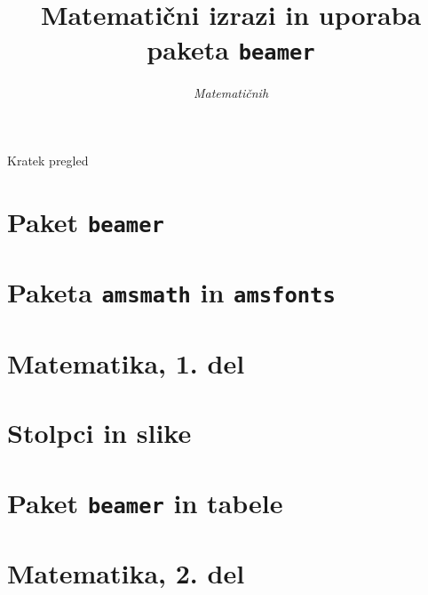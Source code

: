 \documentclass{beamer}
\begin{document}
\title{Matematični izrazi in uporaba paketa \texttt{beamer}}
\subtitle{\emph{Matematičnih}}
\date{}
\titlepage

\begin{frame}{Kratek pregled}
    \tableofcontents%
\end{frame}


 \section{Paket \texttt{beamer}}
 

 \section{Paketa \texttt{amsmath} in \texttt{amsfonts}}
 

 \section[Matematika, 1. del\\\large{Analiza, logika, množice}]{Matematika, 1. del}

 \section{Stolpci in slike}
 

 \section{Paket \texttt{beamer} in tabele}

 \section[Matematika, 2. del\\\large{Zaporedja, algebra, grupe}]{Matematika, 2. del}
\end{document}
